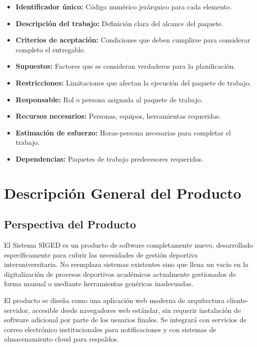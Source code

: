 \documentclass[12pt,a4paper]{article}
\begin{document}
\begin{itemize}[noitemsep]
    \item \textbf{Identificador único:} Código numérico jerárquico para cada elemento.
    \item \textbf{Descripción del trabajo:} Definición clara del alcance del paquete.
    \item \textbf{Criterios de aceptación:} Condiciones que deben cumplirse para considerar completo el entregable.
    \item \textbf{Supuestos:} Factores que se consideran verdaderos para la planificación.
    \item \textbf{Restricciones:} Limitaciones que afectan la ejecución del paquete de trabajo.
    \item \textbf{Responsable:} Rol o persona asignada al paquete de trabajo.
    \item \textbf{Recursos necesarios:} Personas, equipos, herramientas requeridas.
    \item \textbf{Estimación de esfuerzo:} Horas-persona necesarias para completar el trabajo.
    \item \textbf{Dependencias:} Paquetes de trabajo predecesores requeridos.
\end{itemize}


\newpage

\section{Descripción General del Producto}

\subsection{Perspectiva del Producto}

El Sistema SIGED es un producto de software completamente nuevo, desarrollado específicamente para cubrir las necesidades de gestión deportiva interuniversitaria. No reemplaza sistemas existentes sino que llena un vacío en la digitalización de procesos deportivos académicos actualmente gestionados de forma manual o mediante herramientas genéricas inadecuadas.

El producto se diseña como una aplicación web moderna de arquitectura cliente-servidor, accesible desde navegadores web estándar, sin requerir instalación de software adicional por parte de los usuarios finales. Se integrará con servicios de correo electrónico institucionales para notificaciones y con sistemas de almacenamiento cloud para respaldos.
\end{document}
